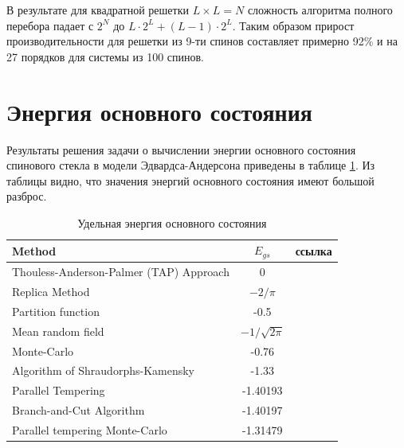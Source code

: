\documentclass[utf8, babel, sor, jor, amsmath, amssymb, reprint]{elsarticle} %
\begin{document}
В результате для квадратной решетки $L \times L=N$ сложность алгоритма полного перебора падает с $2^{N}$ до $L \cdot 2^L + (L - 1) \cdot 2^L$. Таким образом прирост производительности для решетки из 9-ти спинов составляет примерно 92\% и на 27 порядков для системы из 100 спинов.


\section{Энергия основного состояния}

Результаты решения задачи о вычислении энергии основного состояния спинового стекла в модели Эдвардса-Андерсона приведены в таблице \ref{tab:Egs}. Из таблицы видно, что значения энергий основного состояния  имеют большой разброс.

\begin{table}[h]
	\begin{tabular}{|l|c|l|}
		\hline
		Method                                   & $E_{gs}$                                       & ссылка                                          \\ \hline
		Thouless-Anderson-Palmer (TAP) Approach & 0                                              & \cite{thouless1977solution}    \\ \hline
		Replica Method                            & $-2/\pi$                                       & \cite{sherrington1975solvable} \\ \hline
		Partition function                      & -0.5                                           & \cite{tanaka1980analytic}      \\ \hline
		Mean random field                       & $-1/\sqrt{2\pi}$                               & \cite{klein1976comparison}     \\ \hline
		Monte-Carlo                             & -0.76                                          & \cite{kirkpatrick1978infinite} \\ \hline
		Algorithm of Shraudorphs-Kamensky        & -1.33                                          & \cite{karandashev2019global}   \\ \hline
		Parallel Tempering   & -1.40193                                       & \cite{palmer1999ground}        \\ \hline
		Branch-and-Cut Algorithm              & -1.40197                         
		& \cite{campbell2004energy}      \\ \hline
		
		Parallel tempering Monte-Carlo  & -1.31479                                       & \cite{roma2009ground}          \\ \hline
		
		
		
	\end{tabular}
	\label{tab:Egs}
	\caption{Удельная энергия основного состояния}
\end{table}
\end{document}
